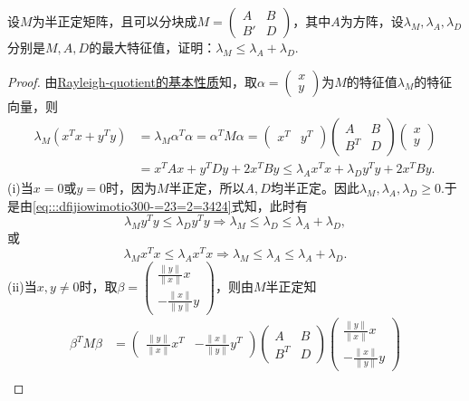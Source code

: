 \documentclass[../../main.tex]{subfiles}%
\begin{document}
\begin{example}
设$M$为半正定矩阵，且可以分块成$M=\begin{pmatrix} A & B \\ B' & D \end{pmatrix}$，其中$A$为方阵，设$\lambda_M,\lambda_A,\lambda_D$分别是$M,A,D$的最大特征值，证明：$\lambda_M \leqslant \lambda_A + \lambda_D$.
\end{example}
\begin{proof}
由\hyperref[proposition:Rayleigh-quotient瑞丽商的基本性质]{Rayleigh-quotient的基本性质}知，取$\alpha =\begin{pmatrix} x \\ y \end{pmatrix}$为$M$的特征值$\lambda_M$的特征向量，则
\begin{align}
\lambda_M (x^T x + y^T y) &= \lambda_M \alpha^T \alpha = \alpha^T M \alpha = \begin{pmatrix} x^T & y^T \end{pmatrix} \begin{pmatrix} A & B \\ B^T & D \end{pmatrix} \begin{pmatrix} x \\ y \end{pmatrix} \nonumber \\
&= x^T A x + y^T D y + 2x^T B y \leqslant \lambda_A x^T x + \lambda_D y^T y + 2x^T B y. \label{eq:::dfijiowimotio300-=23=2=3424}
\end{align}
(i)当$x=0$或$y=0$时，因为$M$半正定，所以$A,D$均半正定。因此$\lambda_M,\lambda_A,\lambda_D\geqslant 0$.于是由\eqref{eq:::dfijiowimotio300-=23=2=3424}式知，此时有
$$\lambda_M y^T y \leqslant \lambda_D y^T y \Longrightarrow \lambda_M \leqslant \lambda_D \leqslant \lambda_A + \lambda_D,$$
或
$$\lambda_M x^T x \leqslant \lambda_A x^T x \Longrightarrow \lambda_M \leqslant \lambda_A \leqslant \lambda_A + \lambda_D.$$
(ii)当$x,y \neq 0$时，取$\beta = \begin{pmatrix} \frac{\| y \|}{\| x \|}x \\ -\frac{\| x \|}{\| y \|}y \end{pmatrix}$，则由$M$半正定知
\begin{align*}
\beta^T M \beta &= \begin{pmatrix} \frac{\| y \|}{\| x \|}x^T & -\frac{\| x \|}{\| y \|}y^T \end{pmatrix} \begin{pmatrix} A & B \\ B^T & D \end{pmatrix} \begin{pmatrix} \frac{\| y \|}{\| x \|}x \\ -\frac{\| x \|}{\| y \|}y \end{pmatrix} \\

\end{align*}
\end{proof}
\end{document}
